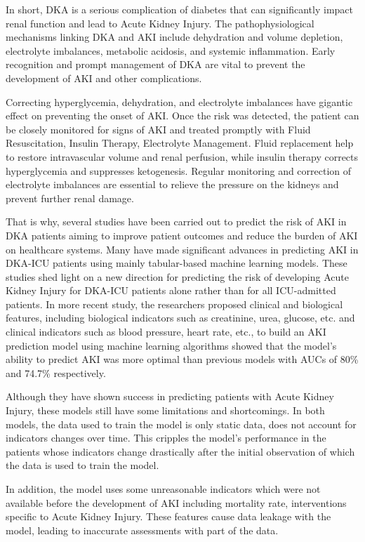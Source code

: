 \documentclass[../main.tex]{subfiles}
\begin{document}
In short, DKA is a serious complication of diabetes that can significantly impact renal function and lead to Acute Kidney Injury. 
The pathophysiological mechanisms linking DKA and AKI include dehydration and volume depletion, electrolyte imbalances, metabolic acidosis, and systemic inflammation. 
Early recognition and prompt management of DKA are vital to prevent the development of AKI and other complications.

Correcting hyperglycemia, dehydration, and electrolyte imbalances have gigantic effect on preventing the onset of AKI. 
Once the risk was detected, the patient can be closely monitored for signs of AKI and treated promptly with Fluid Resuscitation, Insulin Therapy, Electrolyte Management. 
Fluid replacement help to restore intravascular volume and renal perfusion, while insulin therapy corrects hyperglycemia and suppresses ketogenesis.
Regular monitoring and correction of electrolyte imbalances are essential to relieve the pressure on the kidneys and prevent further renal damage.


That is why, several studies have been carried out to predict the risk of AKI in DKA patients aiming to improve patient outcomes and reduce the burden of AKI on healthcare systems.
Many have made significant advances in predicting AKI in DKA-ICU patients using mainly tabular-based machine learning models.
These studies shed light on a new direction for predicting the risk of developing Acute Kidney Injury for DKA-ICU patients alone rather than for all ICU-admitted patients.
In more recent study, the researchers proposed clinical and biological features, including biological indicators such as creatinine, urea, glucose, etc. and clinical indicators such as blood pressure, heart rate, etc., to build an AKI prediction model using machine learning algorithms showed that the model's ability to predict AKI was more optimal than previous models with AUCs of 80\% and 74.7\% respectively.

Although they have shown success in predicting patients with Acute Kidney Injury, these models still have some limitations and shortcomings.
In both models, the data used to train the model is only static data, does not account for indicators changes over time.
This cripples the model's performance in the patients whose indicators change drastically after the initial observation of which the data is used to train the model.

In addition, the model uses some unreasonable indicators which were not available before the development of AKI including mortality rate, interventions specific to Acute Kidney Injury.
These features cause data leakage with the model, leading to inaccurate assessments with part of the data.
\end{document}
